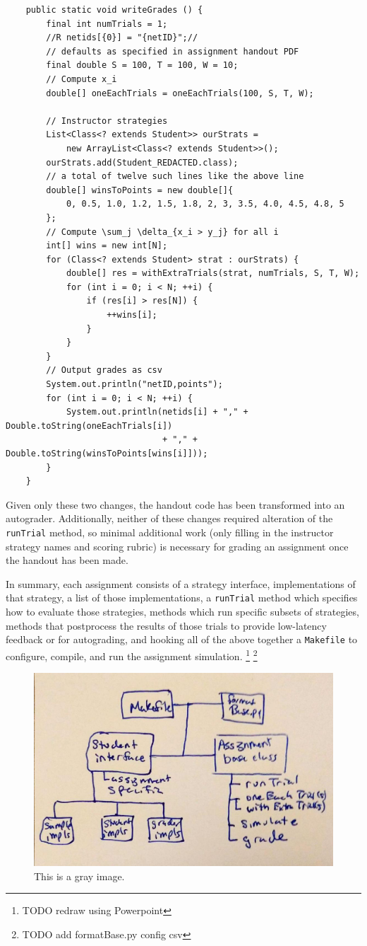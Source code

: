 \documentclass[pageno]{jpaper}
\begin{document}
\begin{verbatim}
    public static void writeGrades () {
        final int numTrials = 1;
        //R netids[{0}] = "{netID}";//
        // defaults as specified in assignment handout PDF
        final double S = 100, T = 100, W = 10;
        // Compute x_i
        double[] oneEachTrials = oneEachTrials(100, S, T, W);

        // Instructor strategies
        List<Class<? extends Student>> ourStrats =
            new ArrayList<Class<? extends Student>>();
        ourStrats.add(Student_REDACTED.class);
        // a total of twelve such lines like the above line
        double[] winsToPoints = new double[]{
            0, 0.5, 1.0, 1.2, 1.5, 1.8, 2, 3, 3.5, 4.0, 4.5, 4.8, 5
        };
        // Compute \sum_j \delta_{x_i > y_j} for all i
        int[] wins = new int[N];
        for (Class<? extends Student> strat : ourStrats) {
            double[] res = withExtraTrials(strat, numTrials, S, T, W);
            for (int i = 0; i < N; ++i) {
                if (res[i] > res[N]) {
                    ++wins[i];
                }
            }
        }
        // Output grades as csv
        System.out.println("netID,points");
        for (int i = 0; i < N; ++i) {
            System.out.println(netids[i] + "," + Double.toString(oneEachTrials[i])
                               + "," + Double.toString(winsToPoints[wins[i]]));
        }
    }
\end{verbatim}
Given only these two changes, the handout code has been transformed into an autograder.
Additionally, neither of these changes required alteration of the \texttt{runTrial} method, so minimal additional work (only filling in the instructor strategy names and scoring rubric) is necessary for grading an assignment once the handout has been made.

In summary, each assignment consists of a strategy interface, implementations of that strategy, a list of those implementations, a \texttt{runTrial} method which specifies how to evaluate those strategies, methods which run specific subsets of strategies, methods that postprocess the results of those trials to provide low-latency feedback or for autograding, and hooking all of the above together a \texttt{Makefile} to configure, compile, and run the assignment simulation.
\footnote{TODO redraw using Powerpoint}
\footnote{TODO add formatBase.py config csv}

\begin{figure}[hbt]
\centering
\includegraphics[width=0.75\linewidth]{Handwritten_Diagram.jpg}
\caption{This is a gray image.}\label{fig:gray}
\end{figure}
\end{document}
